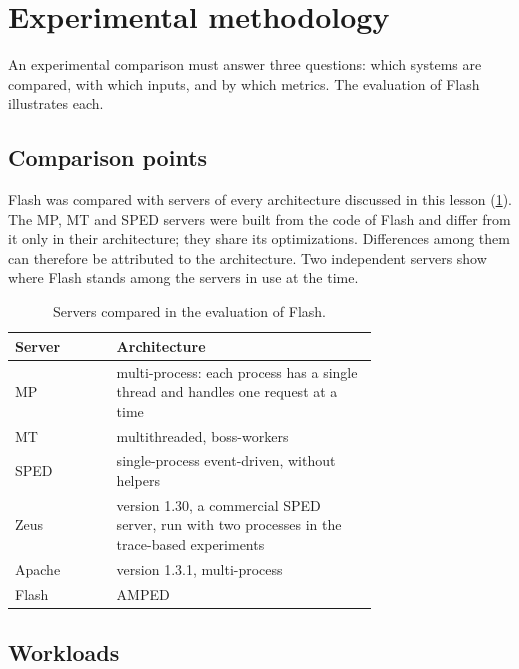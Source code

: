 \documentclass[../main.tex]{subfiles}
\begin{document}
\section{Experimental methodology}
\label{sec:l06-methodology}

An experimental comparison must answer three questions: which systems are
compared, with which inputs, and by which metrics.  The evaluation of Flash illustrates each.

\subsection{Comparison points}

Flash was compared with servers of every architecture discussed in this
lesson (\cref{tab:l06-comparison-points}).  The MP, MT and SPED servers
were built from the code of Flash and differ from it only in their
architecture; they share its optimizations.  Differences among them can
therefore be attributed to the architecture.  Two independent servers show
where Flash stands among the servers in use at the time.

\begin{table}[htbp]
  \centering
  \caption{Servers compared in the evaluation of Flash.}
  \label{tab:l06-comparison-points}
  \small
  \begin{tabular}{@{}l>{\raggedright\arraybackslash}p{0.72\linewidth}@{}}
    \toprule
    Server & Architecture \\
    \midrule
    MP     & multi-process: each process has a single thread and handles one
             request at a time \\
    MT     & multithreaded, boss-workers \\
    SPED   & single-process event-driven, without helpers \\
    Zeus   & version 1.30, a commercial SPED server, run with two processes
             in the trace-based experiments \\
    Apache & version 1.3.1, multi-process \\
    Flash  & AMPED \\
    \bottomrule
  \end{tabular}
\end{table}

\subsection{Workloads}
\end{document}
